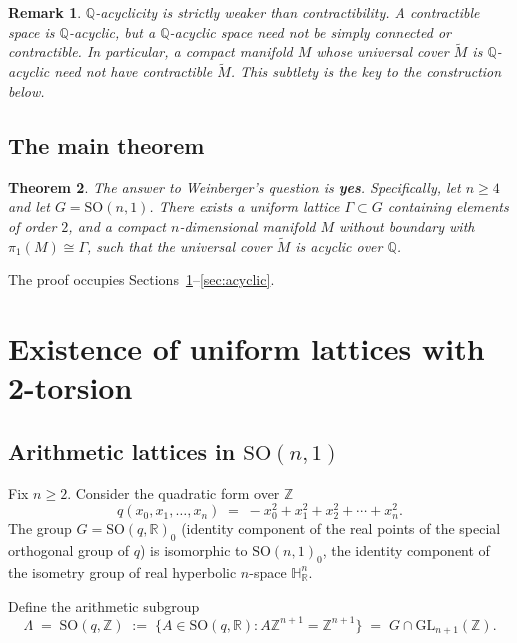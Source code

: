 \documentclass[12pt]{article}
\newtheorem{theorem}{Theorem}[section]
\newtheorem{remark}[theorem]{Remark}
\newcommand{\R}{\mathbb{R}}
\newcommand{\Z}{\mathbb{Z}}
\newcommand{\Q}{\mathbb{Q}}
\newcommand{\HH}{\mathbb{H}}
\newcommand{\SO}{\mathrm{SO}}
\newcommand{\GL}{\mathrm{GL}}
\newcommand{\tilM}{\widetilde{M}}
\begin{document}
\begin{remark}
$\Q$-acyclicity is strictly weaker than contractibility.  A contractible space is $\Q$-acyclic,
but a $\Q$-acyclic space need not be simply connected or contractible.  In particular, a
compact manifold $M$ whose universal cover $\tilM$ is $\Q$-acyclic need not have contractible
$\tilM$.  This subtlety is the key to the construction below.
\end{remark}

\subsection{The main theorem}

\begin{theorem}\label{thm:main}
The answer to Weinberger's question is \textbf{yes}.  Specifically, let $n \geq 4$ and let
$G = \SO(n,1)$.  There exists a uniform lattice $\Gamma \subset G$ containing elements of
order $2$, and a compact $n$-dimensional manifold $M$ without boundary with
$\pi_1(M) \cong \Gamma$, such that the universal cover $\tilM$ is acyclic over $\Q$.
\end{theorem}

The proof occupies Sections~\ref{sec:lattice}--\ref{sec:acyclic}.

\section{Existence of uniform lattices with 2-torsion}
\label{sec:lattice}

\subsection{Arithmetic lattices in $\SO(n,1)$}

Fix $n \geq 2$.  Consider the quadratic form over $\Z$
\[
  q(x_0, x_1, \ldots, x_n) \;=\; -x_0^2 + x_1^2 + x_2^2 + \cdots + x_n^2.
\]
The group $G = \SO(q, \R)_0$ (identity component of the real points of the special orthogonal
group of $q$) is isomorphic to $\SO(n,1)_0$, the identity component of the isometry group of
real hyperbolic $n$-space $\HH^n_\R$.

Define the arithmetic subgroup
\[
  \Lambda \;=\; \SO(q, \Z) \;:=\; \{ A \in \SO(q, \R) : A\Z^{n+1} = \Z^{n+1} \}
            \;=\; G \cap \GL_{n+1}(\Z).
\]
\end{document}
